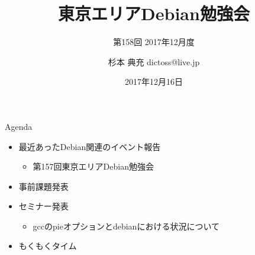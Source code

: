 \title{東京エリアDebian勉強会}
\subtitle{第158回 2017年12月度}
\author{杉本 典充  dictoss@live.jp}
\date{2017年12月16日}



\begin{frame}
\titlepage{}
\end{frame}

\begin{frame}{Agenda}
 \begin{minipage}[t]{0.45\hsize}
  \begin{itemize}
  \item 最近あったDebian関連のイベント報告
    \begin{itemize}
    \item 第157回東京エリアDebian勉強会
    \end{itemize}
  \item 事前課題発表
  \end{itemize}
 \end{minipage}
 \begin{minipage}[t]{0.45\hsize}
  \begin{itemize}
  \item セミナー発表
    \begin{itemize}
    \item gccのpieオプションとdebianにおける状況について
    \end{itemize}
  \item もくもくタイム
  \end{itemize}
 \end{minipage}
\end{frame}

